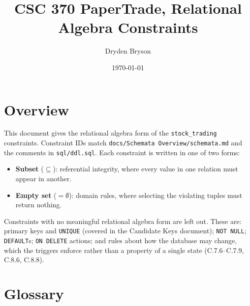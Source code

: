 \documentclass{article}
\title{CSC 370 PaperTrade, Relational Algebra Constraints}
\author{Dryden Bryson}
\date{\today}
\begin{document}
\maketitle
\newpage

\section*{Overview}

This document gives the relational algebra form of the \texttt{stock\_trading} constraints. Constraint IDs match \texttt{docs/Schemata Overview/schemata.md} and the comments in \texttt{sql/ddl.sql}. Each constraint is written in one of two forms:
\begin{itemize}[nosep]
  \item \textbf{Subset} ($\subseteq$): referential integrity, where every value in one relation must appear in another.
  \item \textbf{Empty set} ($= \emptyset$): domain rules, where selecting the violating tuples must return nothing.
\end{itemize}

Constraints with no meaningful relational algebra form are left out. These are: primary keys and \texttt{UNIQUE} (covered in the Candidate Keys document); \texttt{NOT NULL}; \texttt{DEFAULT}s; \texttt{ON DELETE} actions; and rules about how the database may change, which the triggers enforce rather than a property of a single state (C.7.6--C.7.9, C.8.6, C.8.8).

\section*{Glossary}
\end{document}
